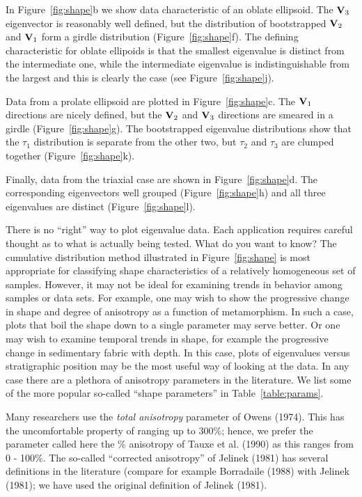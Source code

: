 In Figure~\ref{fig:shape}b we show data characteristic of an oblate
ellipsoid.   The
$\hbox{\bf V}_3$ eigenvector is reasonably well defined, but 
the distribution of bootstrapped $\hbox{\bf V}_2$ and $\hbox{\bf V}_1$ form a girdle 
distribution (Figure~\ref{fig:shape}f).   The defining characteristic for oblate ellipoids is that the smallest  eigenvalue is distinct from the intermediate one, while the intermediate eigenvalue is indistinguishable from the largest and this is clearly the case (see Figure~\ref{fig:shape}j).    

Data from a prolate ellipsoid are plotted in Figure~\ref{fig:shape}c.  The $\hbox{\bf V}_1$ directions are nicely defined, but the 
$\hbox{\bf V}_2$ and $\hbox{\bf V}_3$ directions are smeared in a girdle
(Figure~\ref{fig:shape}g).    The bootstrapped eigenvalue distributions  show that the 
 $\tau_1$ distribution is separate from the other two, but   $\tau_2$ and $\tau_3$ are clumped together  
(Figure~\ref{fig:shape}k).  


Finally, data from the triaxial case are shown in Figure~\ref{fig:shape}d.  The corresponding eigenvectors well grouped
(Figure~\ref{fig:shape}h) and all three
eigenvalues are distinct (Figure~\ref{fig:shape}l).   


 
There is no ``right'' way to plot eigenvalue data.  Each application requires careful thought as to what is actually being tested.  What do you want to know?  
The cumulative distribution method illustrated in Figure~\ref{fig:shape}
 is most appropriate for  classifying shape
characteristics of a relatively homogeneous set of samples.  However,  
it may not be ideal for examining trends in behavior among samples or data sets.
For example, one may wish to show the progressive change in shape and
degree of anisotropy as a function of metamorphism. In such a case, plots that boil the shape down to a single parameter may serve better.   Or one may wish to examine temporal trends in shape, for example the progressive change in sedimentary fabric with depth.  In this case, plots of eigenvalues versus stratigraphic position may be the most useful way of looking at the data.    In any case there are a plethora of anisotropy parameters in the literature.  
 We list some of the more 
popular so-called ``shape parameters'' in Table~\ref{table:params}.


Many researchers use the 
{\it total anisotropy}  parameter of 
Owens (1974). \nocite{owens74}
This has the uncomfortable property of ranging up to 300\%; hence, we prefer
the parameter  called here the \% anisotropy of 
Tauxe et al. (1990)\nocite{tauxe90} 
 as this
ranges from 0
 - 100\%.  The so-called ``corrected anisotropy'' of
  Jelinek (1981) \nocite{jelinek81}
  has several definitions in the literature (compare for example
 Borradaile (1988) \nocite{borradaile88} with 
   Jelinek (1981); 
we have used the  original definition of Jelinek (1981).  

